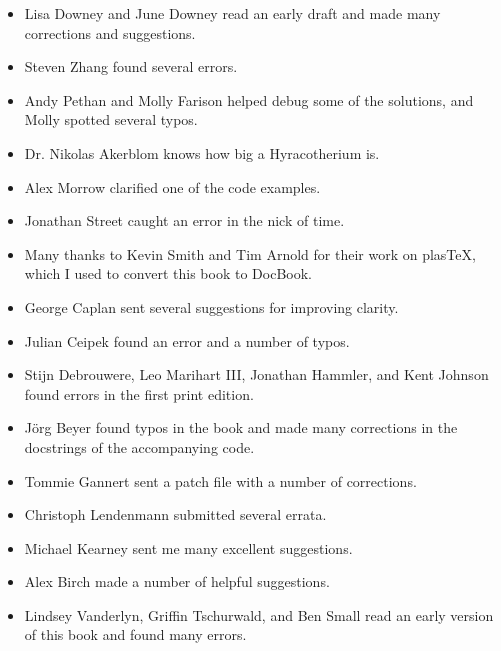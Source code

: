 \documentclass[12pt]{book}
\begin{document}
\begin{itemize}

\item Lisa Downey and June Downey read an early draft and made many
corrections and suggestions.

\item Steven Zhang found several errors.

\item Andy Pethan and Molly Farison helped debug some of the solutions,
and Molly spotted several typos.

\item Dr. Nikolas Akerblom knows how big a Hyracotherium is.

\item Alex Morrow clarified one of the code examples.

\item Jonathan Street caught an error in the nick of time.

\item Many thanks to Kevin Smith and Tim Arnold for their work on
plasTeX, which I used to convert this book to DocBook.

\item George Caplan sent several suggestions for improving clarity.

\item Julian Ceipek found an error and a number of typos.

\item Stijn Debrouwere, Leo Marihart III, Jonathan Hammler, and Kent Johnson
found errors in the first print edition.

\item J\"{o}rg Beyer found typos in the book and made many corrections
in the docstrings of the accompanying code.

\item Tommie Gannert sent a patch file with a number of corrections.

\item Christoph Lendenmann submitted several errata.

\item Michael Kearney sent me many excellent suggestions.

\item Alex Birch made a number of helpful suggestions.

\item Lindsey Vanderlyn, Griffin Tschurwald, and Ben Small read an
  early version of this book and found many errors.


\end{itemize}
\end{document}
